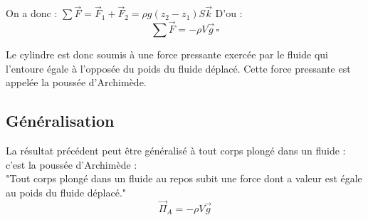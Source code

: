 On a donc : \(\sum \vec{F} = \vec{F}_{1} + \vec{F}_{2} = \rho g (z_{2} - z_{1})S \vec{k}\) D'ou : \\
\[
    \sum \vec{F} = -\rho V \vec{g} \, \square
\] 

Le cylindre est donc soumis à une force pressante exercée par le fluide qui l'entoure égale à l'opposée du poids du fluide déplacé. Cette force pressante est appelée la poussée d'Archimède. 

\subsection{Généralisation}

\begin{theorem}[Généralisation]\label{thm:}
    La résultat précédent peut être généralisé à tout corps plongé dans un fluide : c'est la poussée d'Archimède : \\
    "Tout corps plongé dans un fluide au repos subit une force dont a valeur est égale au poids du fluide déplacé."   
    \[
        \vec{\Pi} _{A} = -\rho V \vec{g}
    \]
\end{theorem}


